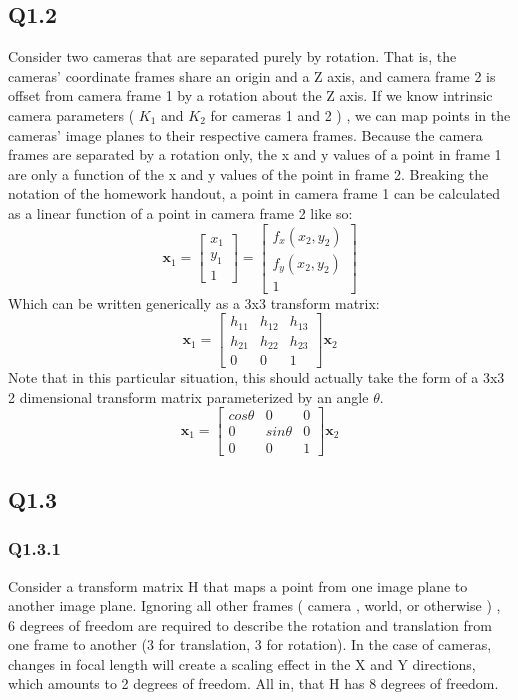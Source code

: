 \documentclass[12pt]{article}
\begin{document}
\subsection{Q1.2}
Consider two cameras that are separated purely by rotation. That is, the cameras' coordinate frames share an origin and a Z axis, and camera frame 2 is offset from camera frame 1 by a rotation about the Z axis. If we know intrinsic camera parameters ( $K_{1}$ and $K_{2}$ for cameras 1 and 2 ) , we can map points in the cameras' image planes to their respective camera frames. Because the camera frames are separated by a rotation only, the x and y values of a point in frame 1 are only a function of the x and y values of the point in frame 2. Breaking the notation of the homework handout, a point in camera frame 1 can be calculated as a linear function of a point in camera frame 2 like so:
$$
\textbf{x}_{1} = 
\begin{bmatrix}
x_{1} \\ y_{1} \\ 1
\end{bmatrix}
=
\begin{bmatrix}
f_{x} ( x_{2} , y_{2} ) \\
f_{y} ( x_{2} , y_{2} ) \\
1
\end{bmatrix}
$$
Which can be written generically as a 3x3 transform matrix:
$$
\textbf{x}_{1} = 
\begin{bmatrix}
h_{11} & h_{12} & h_{13} \\
h_{21} & h_{22} & h_{23} \\
0 & 0 & 1
\end{bmatrix}
\textbf{x}_{2}
$$
Note that in this particular situation, this should actually take the form of a 3x3 2 dimensional transform matrix parameterized by an angle $\theta$.
$$
\textbf{x}_{1} = 
\begin{bmatrix}
cos \theta & 0           & 0 \\
0          & sin \theta  & 0 \\
0          & 0           & 1
\end{bmatrix}
\textbf{x}_{2}
$$

\subsection{Q1.3}
\subsubsection{Q1.3.1}
Consider a transform matrix H that maps a point from one image plane to another image plane. Ignoring all other frames ( camera , world, or otherwise ) , 6 degrees of freedom are required to describe the rotation and translation from one frame to another (3 for translation, 3 for rotation). In the case of cameras, changes in focal length will create a scaling effect in the X and Y directions, which amounts to 2 degrees of freedom. All in, that H has 8 degrees of freedom.
\end{document}

